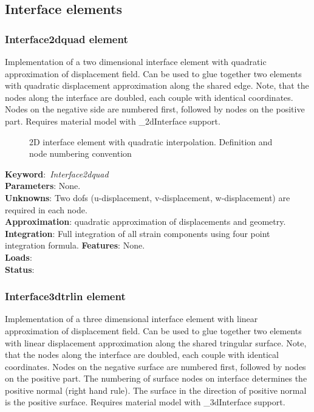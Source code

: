 \documentclass[12pt,dvips]{article}
\newcommand{\descitem}[1]{{\noindent \bf #1}:}
\newcommand{\elemkeyword}[1]{\descitem{Keyword}~{\em #1}}
\begin{document}
\subsection{Interface elements}
\subsubsection{Interface2dquad element}
Implementation of a two dimensional interface element with quadratic
approximation of displacement field. Can be used to glue together two elements with quadratic displacement approximation along the shared edge. Note, that the nodes along the interface are doubled, each couple with identical coordinates. Nodes on the negative side are numbered first, followed by nodes on the positive part. Requires material model with \_2dInterface support. 

\begin{figure}[tb]
\begin{center}\end{center}
\caption{2D interface element with quadratic interpolation. Definition and node numbering convention}
\label{interf2d_quad_fig}
\end{figure}

\elemkeyword{Interface2dquad}\\
\descitem{Parameters} None.\\
\descitem{Unknowns}
Two dofs (u-displacement, v-displacement, w-displacement) are required in each node.\\
\descitem{Approximation} quadratic approximation of displacements and
geometry.
\descitem{Integration}
Full integration of all strain components using four point integration formula.
\descitem{Features} None.\\
\descitem{Loads} \\
\descitem{Status} 

\subsubsection{Interface3dtrlin element}
Implementation of a three dimensional interface element with linear
approximation of displacement field. Can be used to glue together two elements with linear displacement approximation along the shared tringular surface. Note, that the nodes along the interface are doubled, each couple with identical coordinates. Nodes on the negative surface are numbered first, followed by nodes on the positive part. The numbering of surface nodes on interface determines the positive normal (right hand rule). The surface in the direction of positive normal is the positive surface. Requires material model with \_3dInterface support.
\end{document}
